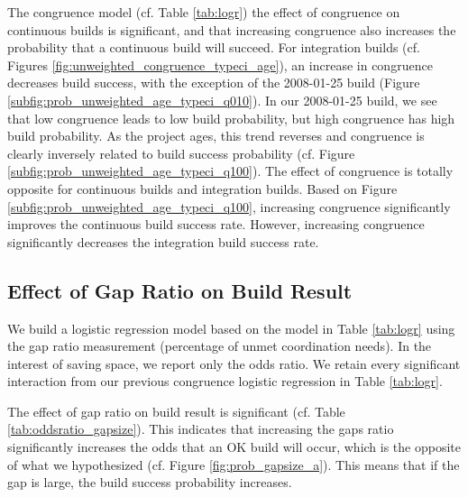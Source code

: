 The congruence model (cf. Table \ref{tab:logr}) the effect of congruence on continuous builds is significant, and that increasing congruence also increases the probability that a continuous build will succeed. 
For integration builds (cf. Figures \ref{fig:unweighted_congruence_typeci_age}), an increase in congruence decreases build success, with the exception of the 2008-01-25 build (Figure \ref{subfig:prob_unweighted_age_typeci_q010}). In our 2008-01-25 build, we see that low congruence leads to low build probability, but high congruence has high build probability. As the project ages, this trend reverses and congruence is clearly inversely related to build success probability (cf. Figure \ref{subfig:prob_unweighted_age_typeci_q100}).
The effect of congruence is totally opposite for continuous builds and integration builds. Based on Figure \ref{subfig:prob_unweighted_age_typeci_q100}, increasing congruence significantly improves the continuous build success rate. However, increasing congruence significantly decreases the integration build success rate.


\subsection{Effect of Gap Ratio on Build Result}
\label{sec:gapsizeresult}
We build a logistic regression model based on the model in Table \ref{tab:logr} using the gap ratio measurement (percentage of unmet coordination needs). In the interest of saving space, we report only the odds ratio. We retain every significant interaction from our previous congruence logistic regression in Table \ref{tab:logr}.

The effect of gap ratio on build result is significant (cf. Table \ref{tab:oddsratio_gapsize}). This indicates that increasing the gaps ratio significantly increases the odds that an OK build will occur, which is the opposite of what we hypothesized (cf. Figure \ref{fig:prob_gapsize_a}). This means that if the gap is large, the build success probability increases.


